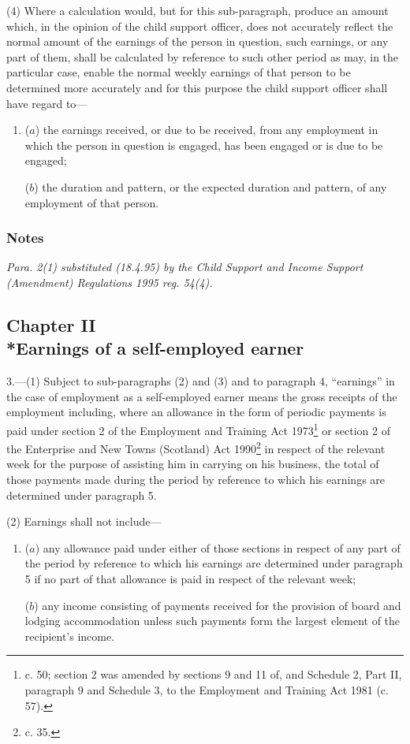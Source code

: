 \documentclass[a4paper]{article}
\newcommand{\parthead}{}
\newcommand\amendment[1]{\subsubsection*{Notes}{\itshape\frenchspacing\footnotesize #1 \par\goodbreak}}
\begin{document}
(4) Where a calculation would, but for this sub-paragraph, produce an amount which, in the opinion of the child support officer, does not accurately reflect the normal amount of the earnings of the person in question, such earnings, or any part of them, shall be calculated by reference to such other period as may, in the particular case, enable the normal weekly earnings of that person to be determined more accurately and for this purpose the child support officer shall have regard to—
\begin{enumerate}\item[]
($a$) the earnings received, or due to be received, from any employment in which the person in question is engaged, has been engaged or is due to be engaged;

($b$) the duration and pattern, or the expected duration and pattern, of any employment of that person.
\end{enumerate}

\amendment{
Para. 2(1) substituted (18.4.95) by the Child Support and Income Support (Amendment) Regulations 1995 reg. 54(4).
}

\subsection[Chapter II --- Earnings of a self-employed earner]{Chapter II\\*Earnings of a self-employed earner}

\renewcommand\parthead{--- Schedule 1 Part I Chapter II}

3.—(1) Subject to sub-paragraphs (2) and (3) and to paragraph 4, “earnings” in the case of employment as a self-employed earner means the gross receipts of the employment including, where an allowance in the form of periodic payments is paid under section 2 of the Employment and Training Act 1973\footnote{ c. 50; section 2 was amended by sections 9 and 11 of, and Schedule 2, Part II, paragraph 9 and Schedule 3, to the Employment and Training Act 1981 (c. 57).} or section 2 of the Enterprise and New Towns (Scotland) Act 1990\footnote{ c. 35.} in respect of the relevant week for the purpose of assisting him in carrying on his business, the total of those payments made during the period by reference to which his earnings are determined under paragraph 5.

(2) Earnings shall not include—
\begin{enumerate}\item[]
($a$) any allowance paid under either of those sections in respect of any part of the period by reference to which his earnings are determined under paragraph 5 if no part of that allowance is paid in respect of the relevant week;

($b$) any income consisting of payments received for the provision of board and lodging accommodation unless such payments form the largest element of the recipient’s income.
\end{enumerate}
\end{document}
